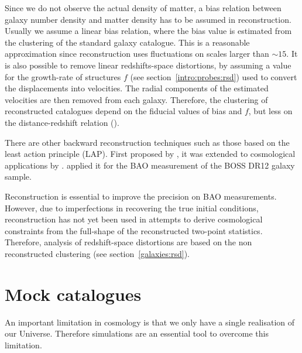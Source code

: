 Since we do not observe the actual density of matter, a bias relation between galaxy number density 
and matter density has to be assumed in reconstruction. Usually we assume a linear bias relation, where the 
bias value is estimated from the clustering of the standard galaxy catalogue. 
This is a reasonable approximation 
since reconstruction uses fluctuations on scales larger than $\sim 15$\hmpc. 
It is also possible to remove linear redshifts-space distortions, 
by assuming a value for the growth-rate of structures $f$
(see section~\ref{intro:probes:rsd}) used to convert the displacements into velocities.
The radial components of the estimated velocities are then removed from each galaxy.  
Therefore, the clustering of reconstructed catalogues depend on the fiducial values of bias and $f$, 
but less on the distance-redshift relation (\cite{carterImpactFiducialCosmology2020}). 

There are other backward reconstruction techniques such as those based on the least action principle (LAP).
First proposed by \cite{peeblesTracingGalaxyOrbits1989}, it was extended to cosmological applications 
by \cite{nusserLeastActionPrinciple2000, sarpaBAOReconstructionSwift2019}. 
\cite{sarpaExtendedFastAction2021} applied it for the BAO measurement of the BOSS DR12 galaxy sample. 

Reconstruction is essential to improve the precision on BAO measurements. However, 
due to imperfections in recovering the true initial conditions, 
reconstruction has not yet been used in attempts to derive cosmological 
constraints from the full-shape of the reconstructed two-point statistics.
Therefore, analysis of redshift-space distortions are based on the non reconstructed 
clustering (see section~\ref{galaxies:rsd}).  

\section{Mock catalogues}
\label{galaxies:mocks}

An important limitation in cosmology is that we only have a single realisation of our Universe. 
Therefore simulations are an essential tool to overcome this limitation. 

